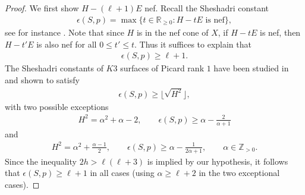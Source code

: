 \documentclass[10pt,a4paper]{amsart}
\numberwithin{equation}{section}
\begin{document}
\begin{proof} We first show $H-(\ell+1) E$ nef. Recall the Sheshadri constant
\begin{gather*}
\epsilon (S, p)= \max \{t \in \mathbb R_{\geq 0}\colon H-tE \text{ is nef}\},
\end{gather*}
see for instance \cite[Definition 5.1.1]{L-I}. Note that since $H$ is in the nef cone of $X$, if $H-tE$ is nef, then $H-t'E$ is also nef for all $0\leq t'\leq t$. Thus it suffices to explain that
\begin{gather*}
\epsilon(S, p)\geq \ell+1.
\end{gather*}
The Sheshadri constants of $K3$ surfaces of Picard rank $1$ have been studied in \cite{K} and shown to satisfy
\begin{gather*}
\epsilon(S, p)\geq \big\lfloor {\sqrt{H^2}}\big\rfloor,
\end{gather*}
with two possible exceptions
\begin{gather*}
H^2=\alpha^2+\alpha-2,\qquad \epsilon(S, p)\geq \alpha - \frac{2}{\alpha+1}
\end{gather*}
and
\begin{gather*}
H^2=\alpha^2+\frac{\alpha-1}{2},\qquad \epsilon(S, p)\geq \alpha -\frac{1}{2\alpha+1}, \qquad \alpha\in \mathbb Z_{>0}.
\end{gather*}
Since the inequality $2h>\ell(\ell+3)$ is implied by our hypothesis, it follows that $\epsilon(S, p)\geq \ell+1$ in all cases (using $\alpha\geq \ell+2$ in the two exceptional cases).


\end{proof}
\end{document}
